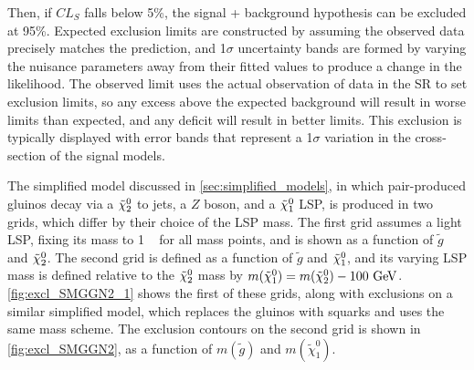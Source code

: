 Then, if $CL_S$ falls below 5\%, the signal + background hypothesis can be excluded at 95\%. Expected exclusion limits are constructed by assuming the observed data precisely matches the prediction, and 1$\sigma$ uncertainty bands are formed by varying the nuisance parameters away from their fitted values to produce a change in the likelihood. The observed limit uses the actual observation of data in the \ac{SR} to set exclusion limits, so any excess above the expected background will result in worse limits than expected, and any deficit will result in better limits. This exclusion is typically displayed with error bands that represent a 1$\sigma$ variation in the cross-section of the signal models. 

The simplified model discussed in \autoref{sec:simplified_models}, in which pair-produced gluinos decay via a $\tilde{\chi}_2^0$ to jets, a $Z$ boson, and a $\tilde{\chi}_1^0$ \ac{LSP}, is produced in two grids, which differ by their choice of the \ac{LSP} mass. The first grid assumes a light \ac{LSP}, fixing its mass to 1 \gev~ for all mass points, and is shown as a function of $\tilde{g}$ and $\tilde{\chi}_2^0$. The second grid is defined as a function of $\tilde{g}$ and $\tilde{\chi}_1^0$, and its varying \ac{LSP} mass is defined relative to the $\tilde{\chi}_2^0$ mass by $m(\tilde{\chi}^{0}_{1}) = m(\tilde{\chi}^{0}_{2}) - 100 \gev$. \autoref{fig:excl_SMGGN2_1} shows the first of these grids, along with exclusions on a similar simplified model, which replaces the gluinos with squarks and uses the same mass scheme. The exclusion contours on the second grid is shown in \autoref{fig:excl_SMGGN2}, as a function of $m(\tilde{g})$ and $m(\tilde{\chi}^{0}_{1})$.

